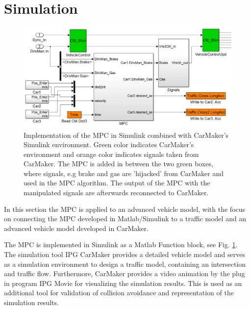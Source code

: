 \documentclass[letterpaper,10pt,conference]{ieeeconf}
\begin{document}
\section{Simulation} \label{sec:simulation}
\begin{figure}[]
    \centering
    \includegraphics[width=1.8\columnwidth]{CarMaker_Implement2.png}
    \caption{Implementation of the MPC in Simulink combined with CarMaker's Simulink environment. Green color indicates CarMaker's environment and orange color indicates signals taken from CarMaker. The MPC is added in between the two green boxes, where signals, e.g brake and gas are 'hijacked' from CarMaker and used in the MPC algorithm. The output of the MPC with the manipulated signals are afterwards reconnected to CarMaker.}
    \label{fig:CM_Implement}
\end{figure}
In this section the MPC is applied to an advanced vehicle model, with the focus on connecting the MPC developed in Matlab/Simulink to a traffic model and an advanced vehicle model developed in CarMaker.

The MPC is implemented in Simulink as a Matlab Function block, see Fig. \ref{fig:CM_Implement}. The simulation tool IPG CarMaker provides a detailed vehicle model and serves as a simulation environment to design a traffic model, containing an intersection and traffic flow. %
Furthermore, CarMaker provides a video animation by the plug in program IPG Movie for visualizing the simulation results. This is used as an additional tool for validation of collision avoidance and representation of the simulation results.
\end{document}

